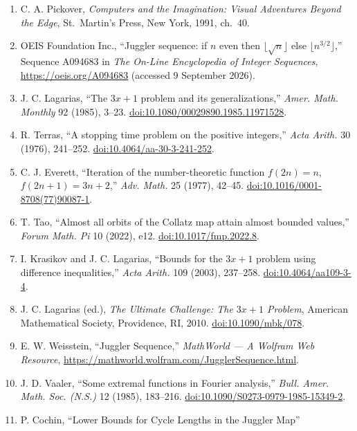 \documentclass[11pt,a4paper]{article}
\providecommand{\tightlist}{\setlength{\itemsep}{0pt}\setlength{\parskip}{0pt}}
\begin{document}
\begin{enumerate}
\def\labelenumi{\arabic{enumi}.}
\tightlist
\item
  C. A. Pickover, \emph{Computers and the Imagination: Visual Adventures
  Beyond the Edge}, St.~Martin's Press, New York, 1991, ch.~40.
\item
  OEIS Foundation Inc., ``Juggler sequence: if \(n\) even then
  \(\lfloor\sqrt n\rfloor\) else \(\lfloor n^{3/2}\rfloor\),'' Sequence
  A094683 in \emph{The On-Line Encyclopedia of Integer Sequences},
  \url{https://oeis.org/A094683} (accessed 9 September 2026).
\item
  J. C. Lagarias, ``The \(3x+1\) problem and its generalizations,''
  \emph{Amer. Math. Monthly} 92 (1985), 3--23.
  \href{https://doi.org/10.1080/00029890.1985.11971528}{doi:10.1080/00029890.1985.11971528}.
\item
  R. Terras, ``A stopping time problem on the positive integers,''
  \emph{Acta Arith.} 30 (1976), 241--252.
  \href{https://doi.org/10.4064/aa-30-3-241-252}{doi:10.4064/aa-30-3-241-252}.
\item
  C. J. Everett, ``Iteration of the number-theoretic function
  \(f(2n)=n\), \(f(2n+1)=3n+2\),'' \emph{Adv. Math.} 25 (1977), 42--45.
  \href{https://doi.org/10.1016/0001-8708(77)90087-1}{doi:10.1016/0001-8708(77)90087-1}.
\item
  T. Tao, ``Almost all orbits of the Collatz map attain almost bounded
  values,'' \emph{Forum Math. Pi} 10 (2022), e12.
  \href{https://doi.org/10.1017/fmp.2022.8}{doi:10.1017/fmp.2022.8}.
\item
  I. Krasikov and J. C. Lagarias, ``Bounds for the \(3x+1\) problem
  using difference inequalities,'' \emph{Acta Arith.} 109 (2003),
  237--258.
  \href{https://doi.org/10.4064/aa109-3-4}{doi:10.4064/aa109-3-4}.
\item
  J. C. Lagarias (ed.), \emph{The Ultimate Challenge: The \(3x+1\)
  Problem}, American Mathematical Society, Providence, RI, 2010.
  \href{https://doi.org/10.1090/mbk/078}{doi:10.1090/mbk/078}.
\item
  E. W. Weisstein, ``Juggler Sequence,'' \emph{MathWorld --- A Wolfram
  Web Resource},
  \url{https://mathworld.wolfram.com/JugglerSequence.html}.
\item
  J. D. Vaaler, ``Some extremal functions in Fourier analysis,''
  \emph{Bull. Amer. Math. Soc. (N.S.)} 12 (1985), 183--216.
  \href{https://doi.org/10.1090/S0273-0979-1985-15349-2}{doi:10.1090/S0273-0979-1985-15349-2}.
\item
  P. Cochin, ``Lower Bounds for Cycle Lengths in the Juggler Map''

\end{enumerate}
\end{document}
